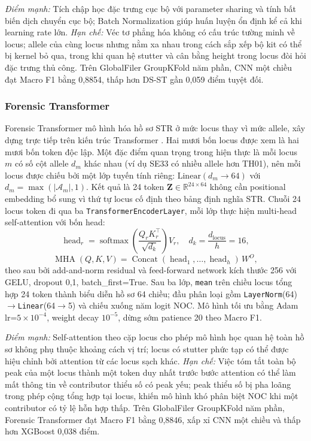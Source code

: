 \documentclass[12pt,a4paper]{article}
\begin{document}
\emph{Điểm mạnh:} Tích chập học đặc trưng cục bộ với parameter sharing và tính bất biến dịch chuyển cục bộ; Batch Normalization giúp huấn luyện ổn định kể cả khi learning rate lớn. \emph{Hạn chế:} Véc tơ phẳng hóa không có cấu trúc tường minh về locus; allele của cùng locus nhưng nằm xa nhau trong cách sắp xếp bộ kit có thể bị kernel bỏ qua, trong khi quan hệ stutter và cân bằng height trong locus đòi hỏi đặc trưng thủ công. Trên GlobalFiler GroupKFold năm phần, CNN một chiều đạt Macro F1 bằng 0,8854, thấp hơn DS-ST gần 0,059 điểm tuyệt đối.

\subsubsection{Forensic Transformer}

Forensic Transformer mô hình hóa hồ sơ STR ở mức locus thay vì mức allele, xây dựng trực tiếp trên kiến trúc Transformer \cite{vaswani2017}. Hai mươi bốn locus được xem là hai mươi bốn token độc lập. Một đặc điểm quan trọng trong hiện thực là mỗi locus $m$ có số cột allele $d_m$ khác nhau (ví dụ SE33 có nhiều allele hơn TH01), nên mỗi locus được chiếu bởi một lớp tuyến tính riêng: $\mathrm{Linear}(d_m \to 64)$ với $d_m = \max(|\mathcal{A}_m|, 1)$. Kết quả là 24 token $\bm{Z} \in \mathbb{R}^{24 \times 64}$ không cần positional embedding bổ sung vì thứ tự locus cố định theo bảng định nghĩa STR. Chuỗi 24 locus token đi qua ba \texttt{TransformerEncoderLayer}, mỗi lớp thực hiện multi-head self-attention với bốn head:
\begin{equation}
\operatorname{head}_r = \operatorname{softmax}\!\left(\frac{Q_r K_r^\top}{\sqrt{d_k}}\right) V_r, \quad d_k = \frac{d_{\mathrm{locus}}}{h} = 16,
\end{equation}
\begin{equation}
\operatorname{MHA}(Q,K,V) = \operatorname{Concat}(\operatorname{head}_1, \ldots, \operatorname{head}_h)\, W^O,
\end{equation}
theo sau bởi add-and-norm residual và feed-forward network kích thước 256 với GELU, dropout 0{,}1, batch\_first=True. Sau ba lớp, \texttt{mean} trên chiều locus tổng hợp 24 token thành biểu diễn hồ sơ 64 chiều; đầu phân loại gồm \texttt{LayerNorm}(64)$\to$\texttt{Linear}(64$\to$5) và chiếu xuống năm logit NOC. Mô hình tối ưu bằng Adam lr=$5\times10^{-4}$, weight decay $10^{-5}$, dừng sớm patience 20 theo Macro F1.

\emph{Điểm mạnh:} Self-attention theo cặp locus cho phép mô hình học quan hệ toàn hồ sơ không phụ thuộc khoảng cách vị trí; locus có stutter phức tạp có thể được hiệu chỉnh bởi attention từ các locus sạch khác. \emph{Hạn chế:} Việc tóm tắt toàn bộ peak của một locus thành một token duy nhất trước bước attention có thể làm mất thông tin về contributor thiểu số có peak yếu; peak thiểu số bị pha loãng trong phép cộng tổng hợp tại locus, khiến mô hình khó phân biệt NOC khi một contributor có tỷ lệ hỗn hợp thấp. Trên GlobalFiler GroupKFold năm phần, Forensic Transformer đạt Macro F1 bằng 0,8846, xấp xỉ CNN một chiều và thấp hơn XGBoost 0,038 điểm.
\end{document}
